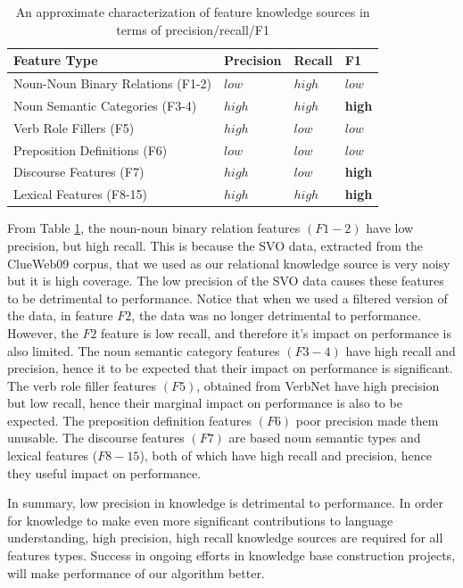 \begin{table}[ht]
%
\centering
%
\begin{tabular}{|l|l|l|l|}
\hline 
\textbf{Feature Type} & \bf{Precision}  & \bf{Recall} & \bf{F1}\\
\hline
Noun-Noun Binary Relations (F1-2) &$low$ & $high$ &  $low$\\
Noun Semantic Categories (F3-4) & $high$ & $high$& \bf{high}\\
Verb Role Fillers (F5) & $high$ & $low$ & $low$ \\
Preposition Definitions (F6) & $low$ & $low$  &$low$ \\
Discourse Features (F7) & $high$ & $low$ & \bf{high} \\
Lexical Features (F8-15) & $high$ & $high$ & \bf{high} \\
\hline
\end{tabular}
\caption{An approximate characterization of feature knowledge sources in terms of precision/recall/F1}
 \label{fig:knowledgef1}
\end{table}  
  
From Table \ref{fig:knowledgef1}, the  noun-noun binary relation features $(F1-2)$ have low precision, but high recall.
This is because the SVO data, extracted   from the ClueWeb09 corpus, that we used as  our  relational knowledge source is very noisy but it is high coverage. The low precision of the SVO data  causes these features to be detrimental to performance.  Notice that when we used a filtered version of the data, in feature $F2$, the data was no longer detrimental to performance. However, the $F2$ feature is low recall, and therefore it's impact on performance is also limited. The noun semantic category features $(F3-4)$ have high recall and precision, hence it to be expected that their impact on performance is significant. The verb role filler features  $(F5)$, obtained from VerbNet  have high precision but low recall, hence their marginal impact  on performance is also to be expected. The preposition definition features $(F6)$  poor precision made them unusable.  The discourse features $(F7)$  are based  noun semantic types and lexical features ($F8-15$),  both of which have high recall and precision, hence they useful impact on performance. 

In summary, low precision in knowledge is detrimental to performance. In order for knowledge to make even more significant contributions to language understanding, high precision, high recall knowledge sources are required for all features types. Success in ongoing efforts in knowledge base construction projects, will make performance of our algorithm better.  

